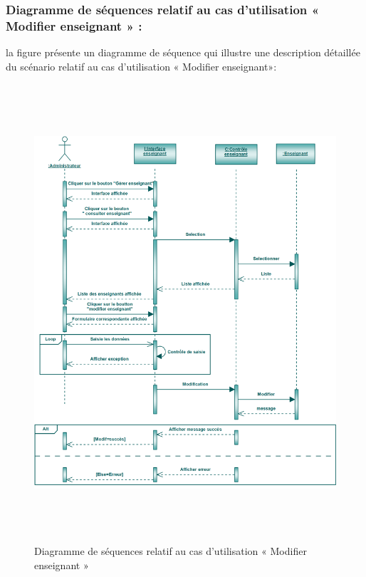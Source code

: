 \documentclass[12 pt]{report}
\begin{document}
\subsubsection{Diagramme de séquences relatif au cas d’utilisation « Modifier enseignant » :}
la figure   présente un diagramme de séquence qui illustre une description détaillée du scénario relatif au cas d’utilisation «  Modifier enseignant»: 
{\begin{figure}[h]
 \begin{center}
\includegraphics[width= 18 cm ,height= 17cm]{sec_modif_ens.PNG}
\caption{Diagramme de séquences relatif au cas d’utilisation « Modifier enseignant »}

\end{center}
\end{figure}}
\newpage
\end{document}
